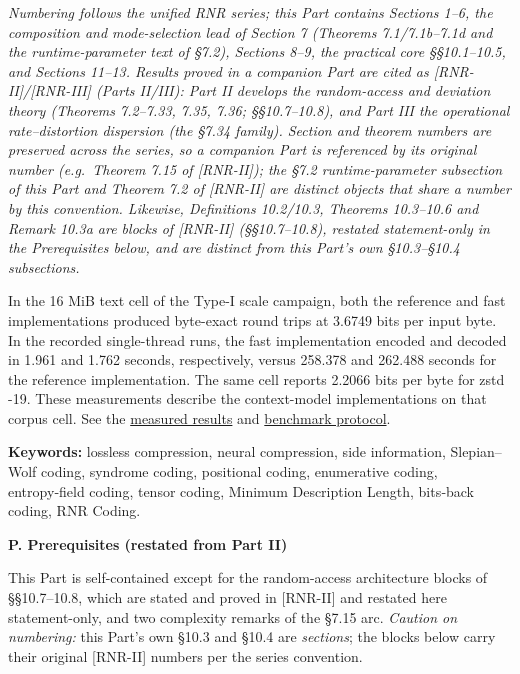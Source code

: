 \documentclass[
]{article}
\begin{document}
\emph{Numbering follows the unified RNR series; this Part contains
Sections 1--6, the composition and mode-selection lead of Section 7
(Theorems 7.1/7.1b--7.1d and the runtime-parameter text of §7.2),
Sections 8--9, the practical core §§10.1--10.5, and Sections 11--13.
Results proved in a companion Part are cited as [RNR-II]/[RNR-III]
(Parts II/III): Part II develops the random-access and deviation theory
(Theorems 7.2--7.33, 7.35, 7.36; §§10.7--10.8), and Part III the
operational rate--distortion dispersion (the §7.34 family). Section and
theorem numbers are preserved across the series, so a companion Part is
referenced by its original number (e.g.\ Theorem 7.15 of [RNR-II]); the
§7.2 runtime-parameter subsection of this Part and Theorem 7.2 of [RNR-II]
are distinct objects that share a number by this convention. Likewise,
Definitions 10.2/10.3, Theorems 10.3--10.6 and Remark 10.3a are blocks of
[RNR-II] (§§10.7--10.8), restated statement-only in the Prerequisites
below, and are distinct from this Part's own §10.3--§10.4 subsections.}

In the 16 MiB text cell of the Type-I scale campaign, both the
reference and fast implementations produced byte-exact round trips at
3.6749 bits per input byte. In the recorded single-thread runs, the fast
implementation encoded and decoded in 1.961 and 1.762 seconds,
respectively, versus 258.378 and 262.488 seconds for the reference
implementation. The same cell reports 2.2066 bits per byte for zstd -19.
These measurements describe the context-model implementations on that
corpus cell. See the \href{https://github.com/ratushnyi-labs/sci-rnr/blob/d287c6f18fa8dccbbca10b705e408c6e528edfb3/experiments/type1_scale/out/figures/summary_16.777MB_text.csv}{measured results}
and \href{https://github.com/ratushnyi-labs/sci-rnr/blob/d287c6f18fa8dccbbca10b705e408c6e528edfb3/experiments/type1_scale/protocol.md}{benchmark protocol}.

\textbf{Keywords:} lossless compression, neural compression, side
information, Slepian--Wolf coding, syndrome coding, positional coding,
enumerative coding, entropy‑field coding, tensor coding, Minimum
Description Length, bits‑back coding, RNR Coding.

\textbf{P. Prerequisites (restated from Part II)}

This Part is self-contained except for the random-access architecture
blocks of §§10.7--10.8, which are stated and proved in [RNR-II] and
restated here statement-only, and two complexity remarks of the §7.15
arc. \emph{Caution on numbering:} this Part's own §10.3 and §10.4 are
\emph{sections}; the blocks below carry their original [RNR-II] numbers
per the series convention.
\end{document}
